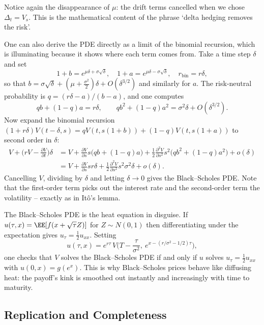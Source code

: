 Notice again the disappearance of $\mu$: the drift terms cancelled when we chose $\Delta_t = V_s$. This is the mathematical content of the phrase `delta hedging removes the risk'.

\begin{remark}
	One can also derive the PDE directly as a limit of the binomial recursion, which is illuminating because it shows where each term comes from. Take a time step $\delta$ and set
	$$
	1+b = e^{\mu\delta + \sigma\sqrt\delta}, \quad 1+a = e^{\mu\delta - \sigma\sqrt\delta}, \quad r_{\mathrm{bin}} = r\delta,
	$$
	so that $b = \sigma\sqrt\delta + (\mu + \tfrac{\sigma^2}{2})\delta + O(\delta^{3/2})$ and similarly for $a$. The risk-neutral probability is $q = (r\delta - a)/(b-a)$, and one computes
	$$
	qb + (1-q)a = r\delta, \qquad qb^2 + (1-q)a^2 = \sigma^2\delta + O(\delta^{3/2}).
	$$
	Now expand the binomial recursion $(1+r\delta)V(t-\delta,s) = qV(t,s(1+b)) + (1-q)V(t,s(1+a))$ to second order in $\delta$:
	\begin{align*}
		V + \Big(rV - \frac{\partial V}{\partial t}\Big)\delta &= V + \frac{\partial V}{\partial s}s\big(qb+(1-q)a\big) + \frac12\frac{\partial^2V}{\partial s^2}s^2\big(qb^2+(1-q)a^2\big) + o(\delta)\\
		&= V + \frac{\partial V}{\partial s}sr\delta + \frac12\frac{\partial^2V}{\partial s^2}s^2\sigma^2\delta + o(\delta).
	\end{align*}
	Cancelling $V$, dividing by $\delta$ and letting $\delta\to0$ gives the Black--Scholes PDE. Note that the first-order term picks out the interest rate and the second-order term the volatility -- exactly as in It\^o's lemma.
\end{remark}

\begin{remark}
	The Black--Scholes PDE is the heat equation in disguise. If $u(\tau,x) = \EE[f(x+\sqrt\tau Z)]$ for $Z\sim N(0,1)$ then differentiating under the expectation gives $u_\tau = \tfrac12 u_{xx}$. Setting
	$$
	u(\tau,x) = e^{r\tau}\,V\Big(T - \frac{\tau}{\sigma^2},\ e^{x - (r/\sigma^2 - 1/2)\tau}\Big),
	$$
	one checks that $V$ solves the Black--Scholes PDE if and only if $u$ solves $u_\tau = \tfrac12u_{xx}$ with $u(0,x) = g(e^x)$. This is why Black--Scholes prices behave like diffusing heat: the payoff's kink is smoothed out instantly and increasingly with time to maturity.
\end{remark}

\subsection{Replication and Completeness}

